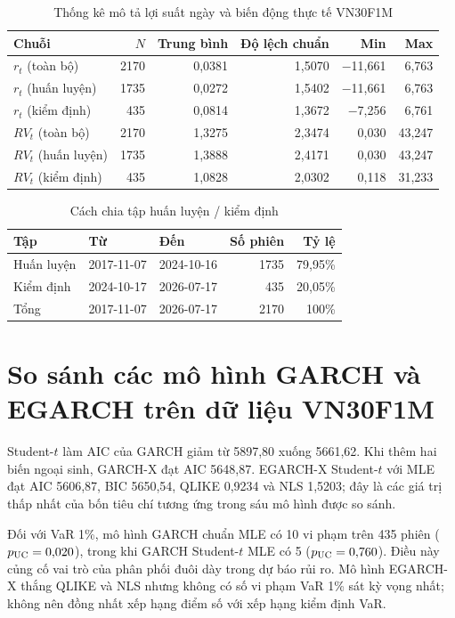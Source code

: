 \documentclass[11pt,a4paper]{article}
\begin{document}
\begin{table}[H]\centering\normalsize
\caption{Thống kê mô tả lợi suất ngày và biến động thực tế VN30F1M}\label{tab:du-lieu}
\begin{tabular}{l r r r r r}
\toprule
\textbf{Chuỗi} & $N$ & \textbf{Trung bình} & \textbf{Độ lệch chuẩn} & \textbf{Min} & \textbf{Max} \\
\midrule
$r_t$ (toàn bộ) & 2170 & 0,0381 & 1,5070 & $-$11,661 & 6,763 \\
$r_t$ (huấn luyện) & 1735 & 0,0272 & 1,5402 & $-$11,661 & 6,763 \\
$r_t$ (kiểm định) & 435 & 0,0814 & 1,3672 & $-$7,256 & 6,761 \\
$RV_t$ (toàn bộ) & 2170 & 1,3275 & 2,3474 & 0,030 & 43,247 \\
$RV_t$ (huấn luyện) & 1735 & 1,3888 & 2,4171 & 0,030 & 43,247 \\
$RV_t$ (kiểm định) & 435 & 1,0828 & 2,0302 & 0,118 & 31,233 \\
\bottomrule
\end{tabular}
\end{table}
\begin{table}[H]\centering\normalsize
\caption{Cách chia tập huấn luyện / kiểm định}\label{tab:chia-tap}
\begin{tabular}{l l l r r}
\toprule
\textbf{Tập} & \textbf{Từ} & \textbf{Đến} & \textbf{Số phiên} & \textbf{Tỷ lệ} \\
\midrule
Huấn luyện & 2017-11-07 & 2024-10-16 & 1735 & 79,95\% \\
Kiểm định & 2024-10-17 & 2026-07-17 & 435 & 20,05\% \\
Tổng & 2017-11-07 & 2026-07-17 & 2170 & 100\% \\
\bottomrule
\end{tabular}
\end{table}

\section{So sánh các mô hình GARCH và EGARCH trên dữ liệu VN30F1M}
Student-$t$ làm AIC của GARCH giảm từ 5897,80 xuống 5661,62. Khi thêm hai biến ngoại sinh, GARCH-X đạt AIC 5648,87. EGARCH-X Student-$t$ với MLE đạt AIC 5606,87, BIC 5650,54, QLIKE 0,9234 và NLS 1,5203; đây là các giá trị thấp nhất của bốn tiêu chí tương ứng trong sáu mô hình được so sánh.

Đối với VaR 1\%, mô hình GARCH chuẩn MLE có 10 vi phạm trên 435 phiên ($p_{\rm UC}=0{,}020$), trong khi GARCH Student-$t$ MLE có 5 ($p_{\rm UC}=0{,}760$). Điều này củng cố vai trò của phân phối đuôi dày trong dự báo rủi ro. Mô hình EGARCH-X thắng QLIKE và NLS nhưng không có số vi phạm VaR 1\% sát kỳ vọng nhất; không nên đồng nhất xếp hạng điểm số với xếp hạng kiểm định VaR.
\end{document}
